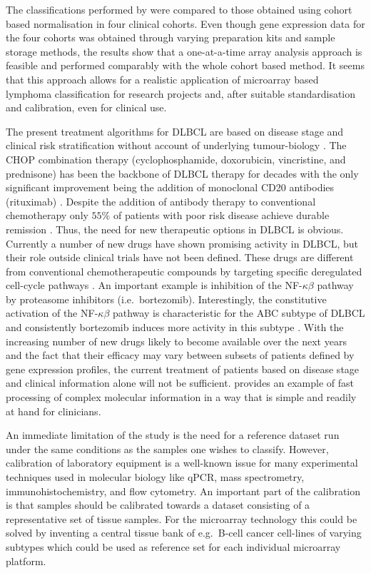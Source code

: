 \documentclass{article}
\begin{document}
The classifications performed by \hemaClass{} were compared to those obtained using cohort based normalisation in four clinical cohorts.
Even though gene expression data for the four cohorts was obtained through varying preparation kits and sample storage methods, the results show that a one-at-a-time array analysis approach is feasible and performed comparably with the whole cohort based method.
It seems that this approach allows for a realistic application of microarray based lymphoma classification for research projects and, after suitable standardisation and calibration, even for clinical use.

The present treatment algorithms for DLBCL are based on disease stage and clinical risk stratification without account of underlying tumour-biology \citep{Schmoll2012}.
The CHOP combination therapy (cyclophosphamide, doxorubicin, vincristine, and prednisone) has been the backbone of DLBCL therapy for decades with the only significant improvement being the addition of monoclonal CD20 antibodies (rituximab) \citep{Coiffier2002a}.
Despite the addition of antibody therapy to conventional chemotherapy only $55\%$ of patients with poor risk disease achieve durable remission \citep{Ziepert2010}.
Thus, the need for new therapeutic options in DLBCL is obvious.
Currently a number of new drugs have shown promising activity in DLBCL, but their role outside clinical trials have not been defined.
These drugs are different from conventional chemotherapeutic compounds by targeting specific deregulated cell-cycle pathways \citep{Friedberg2011}.
An important example is inhibition of the NF-$\kappa\beta$ pathway by proteasome inhibitors (i.e.\ bortezomib).
Interestingly, the constitutive activation of the NF-$\kappa\beta$ pathway is characteristic for the ABC subtype of DLBCL and consistently bortezomib induces more activity in this subtype \citep{Nogai2013}.
With the increasing number of new drugs likely to become available over the next years and the fact that their efficacy may vary between subsets of patients defined by gene expression profiles, the current treatment of patients based on disease stage and clinical information alone will not be sufficient.
\hemaClass{} provides an example of fast processing of complex molecular information in a way that is simple and readily at hand for clinicians.

An immediate limitation of the study is the need for a reference dataset run under the same conditions as the samples one wishes to classify.
However, calibration of laboratory equipment is a well-known issue for many experimental techniques used in molecular biology like qPCR, mass spectrometry, immunohistochemistry, and flow cytometry.
An important part of the calibration is that samples should be calibrated towards a dataset consisting of a representative set of tissue samples.
For the microarray technology this could be solved by inventing a central tissue bank of e.g.\ B-cell cancer cell-lines of varying subtypes which could be used as reference set for each individual microarray platform.
\end{document}
